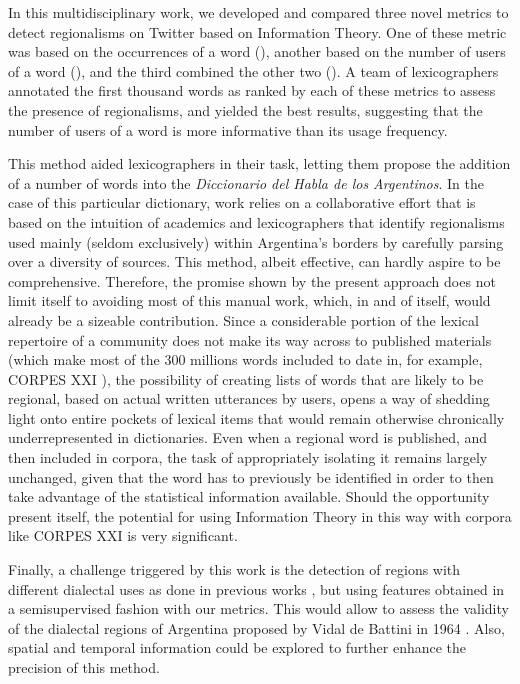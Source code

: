 In this multidisciplinary work, we developed and compared three novel metrics to detect regionalisms on Twitter based on Information Theory. One of these metric was based on the occurrences of a word (\wordmetric), another based on the number of users of a word (\usermetric), and the third combined the other two (\mixedmetric). A team of lexicographers annotated the first thousand words as ranked by each of these metrics to assess the presence of regionalisms, and \usermetric{} yielded the best results, suggesting that the number of users of a word is more informative than its usage frequency.

This method aided lexicographers in their task, letting them
propose the addition of a number of words into 
the \emph{Diccionario del Habla de los Argentinos}. In the case of this particular dictionary, work relies on a collaborative effort that is based on the intuition of academics and lexicographers that identify regionalisms used mainly (seldom exclusively) within Argentina's borders by carefully parsing over a diversity of sources. This method, albeit effective, can hardly aspire to be comprehensive. Therefore, the promise shown by the present approach does not limit itself to avoiding most of this manual work, which, in and of itself, would already be a sizeable contribution. Since a considerable portion of the lexical repertoire of a community does not make its way across to published materials (which make most of the 300 millions words included to date in, for example, CORPES XXI \cite{espanolabanco}), the possibility of creating lists of words that are likely to be regional, based on actual written utterances by users, opens a way of shedding light onto entire pockets of lexical items that would remain otherwise chronically underrepresented in dictionaries. Even when a regional word is published, and then included in corpora, the task of appropriately isolating it remains largely unchanged, given that the word has to previously be identified in order to then take advantage of the statistical information available. Should the opportunity present itself, the potential for using Information Theory in this way with corpora like CORPES XXI is very significant.

Finally, a challenge triggered by this work is the detection of regions with different dialectal uses as done in previous works \cite{gonccalves2014crowdsourcing}, but using features obtained in a semisupervised fashion with our metrics. This would allow to assess the validity of the dialectal regions of Argentina proposed by Vidal de Battini in 1964 \cite{vidal1964espanol}. Also, spatial and temporal information could be explored to further enhance the precision of this method. 

